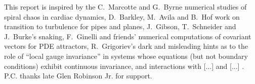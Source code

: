 

\bigskip
{}
This report is inspired by the C.~Marcotte and G.~Byrne numerical
studies of spiral chaos in cardiac dynamics, D.~Barkley, M.~Avila and B.~Hof
work on transition to turbulence for pipes and planes,
J.~Gibson, T.~Schneider and J.~Burke's snaking, F.~Ginelli and friends'
numerical computations of covariant vectors for PDE attractors,
R.~Grigoriev's dark and misleading
hints as to the role of ``local gauge invariance''
in systems whose equations (but not boundary conditions) exhibit
continuous invariance, and
 interactions with
[...] and
[...] .
P.C. thanks late Glen Robinson Jr. for support. 	
